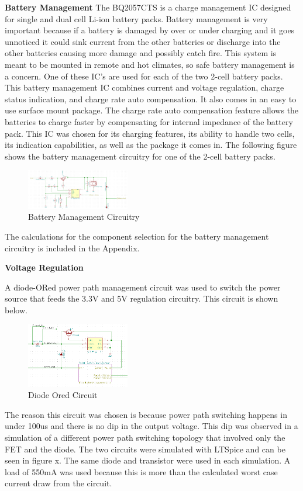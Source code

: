 \documentclass{article}
\begin{document}
{\textbf{Battery Management}
The BQ2057CTS is a charge management IC designed for single and dual cell Li-ion battery packs. Battery management is very important because if a battery is damaged by over or under charging and it goes unnoticed it could sink current from the other batteries or discharge into the other batteries causing more damage and possibly catch fire. This system is meant to be mounted in remote and hot climates, so safe battery management is a concern. One of these IC’s are used for each of the two 2-cell battery packs. This battery management IC combines current and voltage regulation, charge status indication, and charge rate auto compensation. It also comes in an easy to use surface mount package. The charge rate auto compensation feature allows the batteries to charge faster by compensating for internal impedance of the battery pack. This IC was chosen for its charging features, its ability to handle two cells, its indication capabilities, as well as the package it comes in. The following figure shows the battery management circuitry for one of the 2-cell battery packs.

\begin{figure}[H]
	\centering
	\includegraphics[width=0.4\textwidth]{BatteryManage}
	\caption{Battery Management Circuitry}
	\label{fig:batman}
\end{figure}

The calculations for the component selection for the battery management circuitry is included in the Appendix.

\textbf{Voltage Regulation}

A diode-ORed power path management circuit was used to switch the power source that feeds the 3.3V and 5V regulation circuitry. This circuit is shown below. 
\begin{figure}[H]
	\centering
	\includegraphics[width=0.4\textwidth]{DiodeOR}
	\caption{Diode Ored Circuit}
	\label{fig:dored}
\end{figure}
The reason this circuit was chosen is because power path switching happens in under 100us and there is no dip in the output voltage. This dip was observed in a simulation of a different power path switching topology that involved only the FET and the diode. The two circuits were simulated with LTSpice and can be seen in figure x. The same diode and transistor were used in each simulation. A load of 550mA was used because this is more than the calculated worst case current draw from the circuit. 

}
\end{document}
